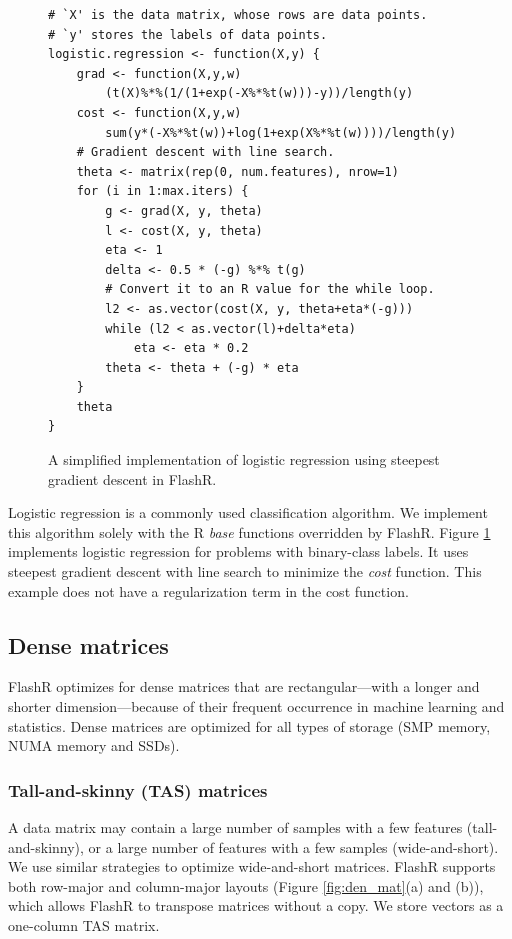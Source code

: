 \begin{figure}
\begin{verbatim}
# `X' is the data matrix, whose rows are data points.
# `y' stores the labels of data points.
logistic.regression <- function(X,y) {
	grad <- function(X,y,w)
		(t(X)%*%(1/(1+exp(-X%*%t(w)))-y))/length(y)
	cost <- function(X,y,w)
		sum(y*(-X%*%t(w))+log(1+exp(X%*%t(w))))/length(y)
	# Gradient descent with line search.
	theta <- matrix(rep(0, num.features), nrow=1)
	for (i in 1:max.iters) {
		g <- grad(X, y, theta)
		l <- cost(X, y, theta)
		eta <- 1
		delta <- 0.5 * (-g) %*% t(g)
		# Convert it to an R value for the while loop.
		l2 <- as.vector(cost(X, y, theta+eta*(-g)))
		while (l2 < as.vector(l)+delta*eta)
			eta <- eta * 0.2
		theta <- theta + (-g) * eta
	}
	theta
}
\end{verbatim}
\vspace{-10pt}
\caption{A simplified implementation of logistic regression using
steepest gradient descent in FlashR.}
\label{logistic}
\vspace{-5pt}
\end{figure}

Logistic regression is a commonly used classification algorithm.
We implement this algorithm solely with the R \textit{base} functions
overridden by FlashR. Figure
\ref{logistic} implements logistic regression for problems with binary-class
labels. It uses steepest gradient descent with line search to minimize
the \textit{cost} function. This example does not have a regularization term
in the cost function.

\subsection{Dense matrices}
FlashR optimizes for dense matrices that are rectangular---with
a longer and shorter dimension---because of their frequent occurrence
in machine learning and statistics. Dense matrices are optimized for
all types of storage (SMP memory, NUMA memory and SSDs).

\subsubsection{Tall-and-skinny (TAS) matrices}
A data matrix may contain a large number of samples with a few features
(tall-and-skinny),
or a large number of features with a few samples (wide-and-short).
We use similar strategies to optimize wide-and-short matrices. FlashR
supports both row-major and column-major layouts (Figure \ref{fig:den_mat}(a)
and (b)), which allows FlashR to transpose matrices without a copy.
We store vectors as a one-column TAS matrix.

